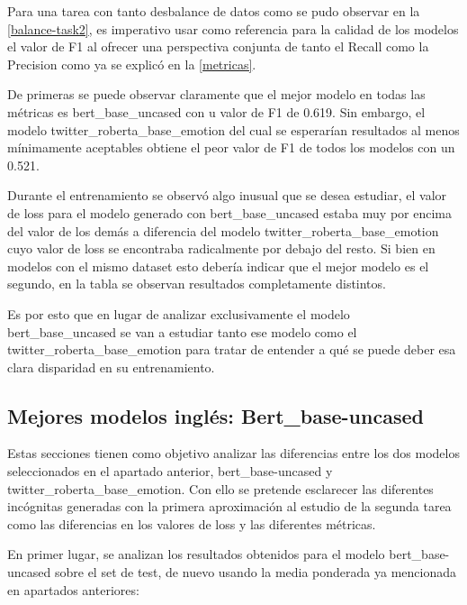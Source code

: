 Para una tarea con tanto desbalance de datos como se pudo observar en la \autoref{balance-task2}, es imperativo usar como referencia para la calidad de los modelos el valor de F1 al ofrecer una perspectiva conjunta de tanto el Recall como la Precision como ya se explicó en la \autoref{metricas}.

De primeras se puede observar claramente que el mejor modelo en todas las métricas es bert\_base\_uncased con u valor de F1 de 0.619. Sin embargo, el modelo twitter\_roberta\_base\_emotion del cual se esperarían resultados al menos mínimamente aceptables obtiene el peor valor de F1 de todos los modelos con un 0.521.

Durante el entrenamiento se observó algo inusual que se desea estudiar, el valor de loss para el modelo generado con bert\_base\_uncased estaba muy por encima del valor de los demás a diferencia del modelo twitter\_roberta\_base\_emotion cuyo valor de loss se encontraba radicalmente por debajo del resto. Si bien en modelos con el mismo dataset esto debería indicar que el mejor modelo es el segundo, en la tabla se observan resultados completamente distintos.

Es por esto que en lugar de analizar exclusivamente el modelo bert\_base\_uncased se van a estudiar tanto ese modelo como el twitter\_roberta\_base\_emotion para tratar de entender a qué se puede deber esa clara disparidad en su entrenamiento.

\subsection{Mejores modelos inglés: Bert\_base-uncased}

Estas secciones tienen como objetivo analizar las diferencias entre los dos modelos seleccionados en el apartado anterior, bert\_base-uncased y twitter\_roberta\_base\_emotion. Con ello se pretende esclarecer las diferentes incógnitas generadas con la primera aproximación al estudio de la segunda tarea como las diferencias en los valores de loss y las diferentes métricas.

En primer lugar, se analizan los resultados obtenidos para el modelo bert\_base-uncased sobre el set de test, de nuevo usando la media ponderada ya mencionada en apartados anteriores: 

